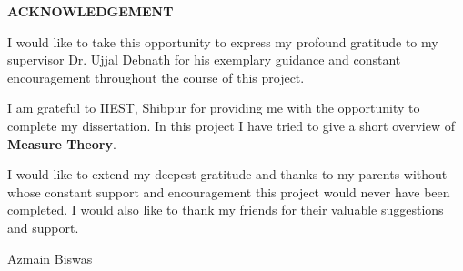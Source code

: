 \begin{center}
    \LARGE{\textbf{ACKNOWLEDGEMENT}}
\end{center}
\begin{flushleft}
    \Large
    I would like to take this opportunity to express my profound gratitude to my supervisor Dr. Ujjal Debnath 
    for his exemplary guidance and constant encouragement throughout the course of this project. 

    \vspace{5mm}
    I am grateful to IIEST, Shibpur for providing me with the opportunity to complete my dissertation. 
    In this project I have tried to give a short overview of \textbf{Measure Theory}.

    \vspace{5mm}
    I would like to extend my deepest gratitude and thanks to my parents without whose constant support and encouragement this project would never have been completed. 
    I would also like to thank my friends for their valuable suggestions and support.
\end{flushleft}

\begin{flushright}
    \Large
    Azmain Biswas
\end{flushright}
